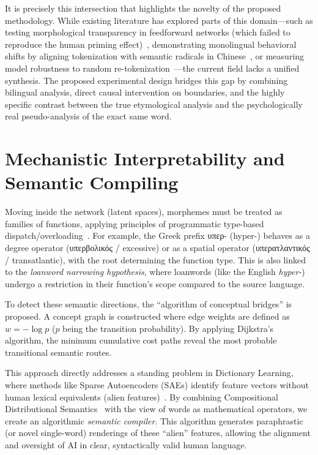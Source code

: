 \documentclass[11pt,a4paper]{article}
\begin{document}
It is precisely this intersection that highlights the novelty of the proposed methodology. While existing literature has explored parts of this domain---such as testing morphological transparency in feedforward networks (which failed to reproduce the human priming effect)~\cite{stevens2020}, demonstrating monolingual behavioral shifts by aligning tokenization with semantic radicals in Chinese~\cite{haslett2025}, or measuring model robustness to random re-tokenization~\cite{zheng2025}---the current field lacks a unified synthesis. The proposed experimental design bridges this gap by combining bilingual analysis, direct causal intervention on boundaries, and the highly specific contrast between the true etymological analysis and the psychologically real pseudo-analysis of the exact same word.

\section{Mechanistic Interpretability and Semantic Compiling}

Moving inside the network (latent spaces), morphemes must be treated as families of functions, applying principles of programmatic type-based dispatch/overloading~\cite{lieber2004,plag2018}. For example, the Greek prefix υπερ- (hyper-) behaves as a degree operator (υπερβολικός / excessive) or as a spatial operator (υπερατλαντικός / transatlantic), with the root determining the function type. This is also linked to the \emph{loanword narrowing hypothesis}, where loanwords (like the English \textit{hyper-}) undergo a restriction in their function's scope compared to the source language.

To detect these semantic directions, the ``algorithm of conceptual bridges'' is proposed. A concept graph is constructed where edge weights are defined as $w = -\log p$ ($p$ being the transition probability). By applying Dijkstra's algorithm, the minimum cumulative cost paths reveal the most probable transitional semantic routes.

This approach directly addresses a standing problem in Dictionary Learning, where methods like Sparse Autoencoders (SAEs) identify feature vectors without human lexical equivalents (alien features)~\cite{bricken2023,cunningham2024}. By combining Compositional Distributional Semantics~\cite{coecke2010} with the view of words as mathematical operators, we create an algorithmic \emph{semantic compiler}. This algorithm generates paraphrastic (or novel single-word) renderings of these ``alien'' features, allowing the alignment and oversight of AI in clear, syntactically valid human language.
\end{document}

